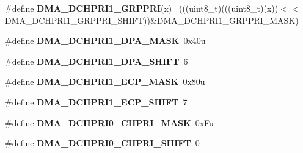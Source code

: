 \begin{DoxyCompactItemize}
\item 
\hypertarget{group___d_m_a___register___masks_ga592472ab04313f28611d7bfec49e0d18}{}\#define {\bfseries D\+M\+A\+\_\+\+D\+C\+H\+P\+R\+I1\+\_\+\+G\+R\+P\+P\+R\+I}(x)                                    ~(((uint8\+\_\+t)(((uint8\+\_\+t)(x))$<$$<$D\+M\+A\+\_\+\+D\+C\+H\+P\+R\+I1\+\_\+\+G\+R\+P\+P\+R\+I\+\_\+\+S\+H\+I\+F\+T))\&D\+M\+A\+\_\+\+D\+C\+H\+P\+R\+I1\+\_\+\+G\+R\+P\+P\+R\+I\+\_\+\+M\+A\+S\+K)\label{group___d_m_a___register___masks_ga592472ab04313f28611d7bfec49e0d18}

\item 
\hypertarget{group___d_m_a___register___masks_ga6a463897cc661b31a11d35fa0f31671a}{}\#define {\bfseries D\+M\+A\+\_\+\+D\+C\+H\+P\+R\+I1\+\_\+\+D\+P\+A\+\_\+\+M\+A\+S\+K}~0x40u\label{group___d_m_a___register___masks_ga6a463897cc661b31a11d35fa0f31671a}

\item 
\hypertarget{group___d_m_a___register___masks_ga88db9a46c344a07de9dc96e527e97e4f}{}\#define {\bfseries D\+M\+A\+\_\+\+D\+C\+H\+P\+R\+I1\+\_\+\+D\+P\+A\+\_\+\+S\+H\+I\+F\+T}~6\label{group___d_m_a___register___masks_ga88db9a46c344a07de9dc96e527e97e4f}

\item 
\hypertarget{group___d_m_a___register___masks_ga14d7f4364a392f0b23a4effdf3f04f4a}{}\#define {\bfseries D\+M\+A\+\_\+\+D\+C\+H\+P\+R\+I1\+\_\+\+E\+C\+P\+\_\+\+M\+A\+S\+K}~0x80u\label{group___d_m_a___register___masks_ga14d7f4364a392f0b23a4effdf3f04f4a}

\item 
\hypertarget{group___d_m_a___register___masks_ga404b79e3e633ecb770dbf283d8b5fccd}{}\#define {\bfseries D\+M\+A\+\_\+\+D\+C\+H\+P\+R\+I1\+\_\+\+E\+C\+P\+\_\+\+S\+H\+I\+F\+T}~7\label{group___d_m_a___register___masks_ga404b79e3e633ecb770dbf283d8b5fccd}

\item 
\hypertarget{group___d_m_a___register___masks_ga5d1b7f82e1bbdb7b8e2f15cb88712022}{}\#define {\bfseries D\+M\+A\+\_\+\+D\+C\+H\+P\+R\+I0\+\_\+\+C\+H\+P\+R\+I\+\_\+\+M\+A\+S\+K}~0x\+Fu\label{group___d_m_a___register___masks_ga5d1b7f82e1bbdb7b8e2f15cb88712022}

\item 
\hypertarget{group___d_m_a___register___masks_gae28baaa3d91720906d6880186c20f7c0}{}\#define {\bfseries D\+M\+A\+\_\+\+D\+C\+H\+P\+R\+I0\+\_\+\+C\+H\+P\+R\+I\+\_\+\+S\+H\+I\+F\+T}~0\label{group___d_m_a___register___masks_gae28baaa3d91720906d6880186c20f7c0}


\end{DoxyCompactItemize}
